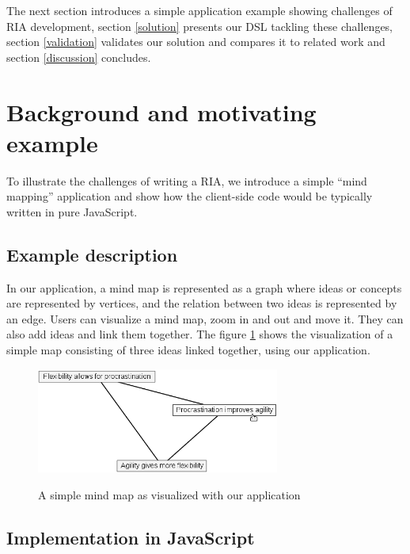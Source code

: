 \documentclass[american,english,runningheads]{llncs}
\begin{document}
The next section introduces a simple application example showing challenges of RIA development, section \ref{solution} presents our DSL tackling these challenges, section \ref{validation} validates our solution and compares it to related work and section \ref{discussion} concludes.


\section{Background and motivating example}
\label{problem}

To illustrate the challenges of writing a RIA, we introduce a simple “mind mapping” application and show how the client-side code would be typically written in pure JavaScript.

\subsection{Example description}

In our application, a mind map is represented as a graph where ideas or concepts are represented by vertices, and the relation between two ideas is represented by an edge. Users can visualize a mind map, zoom in and out and move it. They can also add ideas and link them together. The figure \ref{mindmap} shows the visualization of a simple map consisting of three ideas linked together, using our application.

\begin{figure}
 \caption{A simple mind map as visualized with our application}
 \centering
 \includegraphics[width=8cm]{mindmap.png}
 \label{mindmap}
\end{figure}

\subsection{Implementation in JavaScript}
\end{document}
